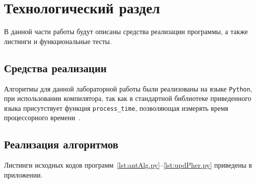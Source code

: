 \chapter{Технологический раздел}

В данной части работы будут описаны средства реализации программы, а также листинги и функциональные тесты.

\section{Средства реализации}
Алгоритмы для данной лабораторной работы были реализованы на языке \texttt{Python}, при использовании компилятора, так как в стандартной библиотеке приведенного языка
присутствует функция \texttt{process\_time}, позволяющая измерять время процессорного времени~\cite{process_time}.
	
	
	
\section{Реализация алгоритмов}
Листинги исходных кодов программ~\ref{lst:antAlg.py}--\ref{lst:updPher.py} приведены в приложении.
	

